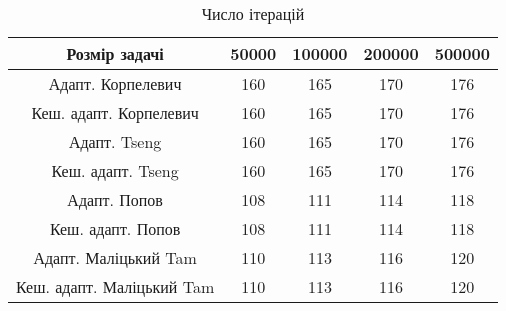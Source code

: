 \begin{table}[H]
	\centering
	\begin{tabular}{|c||c|c|c|c|}\hline
		Розмір задачі & 50000 & 100000 & 200000 & 500000 \\ \hline \hline
		Адапт. Корпелевич & 160 & 165 & 170 & 176 \\ \hline
		Кеш. адапт. Корпелевич & 160 & 165 & 170 & 176 \\ \hline
		Адапт. Tseng & 160 & 165 & 170 & 176 \\ \hline
		Кеш. адапт. Tseng & 160 & 165 & 170 & 176 \\ \hline
		Адапт. Попов & 108 & 111 & 114 & 118 \\ \hline
		Кеш. адапт. Попов & 108 & 111 & 114 & 118 \\ \hline
		Адапт. Маліцький Tam & 110 & 113 & 116 & 120 \\ \hline
		Кеш. адапт. Маліцький Tam & 110 & 113 & 116 & 120 \\ \hline
	\end{tabular}
	\caption{Число ітерацій}
\end{table}
